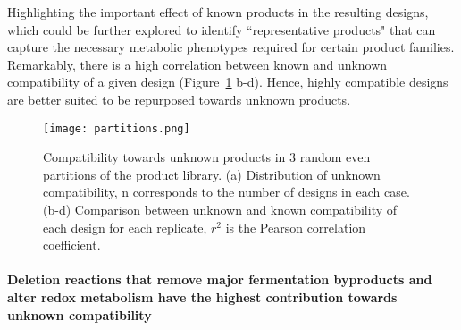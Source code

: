 {Highlighting the important effect of known products in the resulting designs, which could be further explored to identify ``representative products" that can capture the necessary metabolic phenotypes required for certain product families. %
Remarkably, there is a high correlation between known and unknown compatibility
of a given design (Figure~\ref{fig7:partitions} b-d).
Hence, highly compatible designs are better suited to be repurposed towards unknown products.

\begin{figure}[h]
    \centering
    \texttt{[image: partitions.png]}
    \caption[Compatibility towards unknown products]{Compatibility towards unknown products in 3 random even partitions of the product library. (a) Distribution of unknown compatibility, n corresponds to the number of designs in each case. (b-d) Comparison between unknown and known compatibility of each design for each replicate, $r^2$ is the Pearson correlation coefficient.}
    \label{fig7:partitions}
\end{figure}

\paragraph{Deletion reactions that remove major fermentation byproducts and alter redox metabolism have the highest contribution towards unknown compatibility}

}
